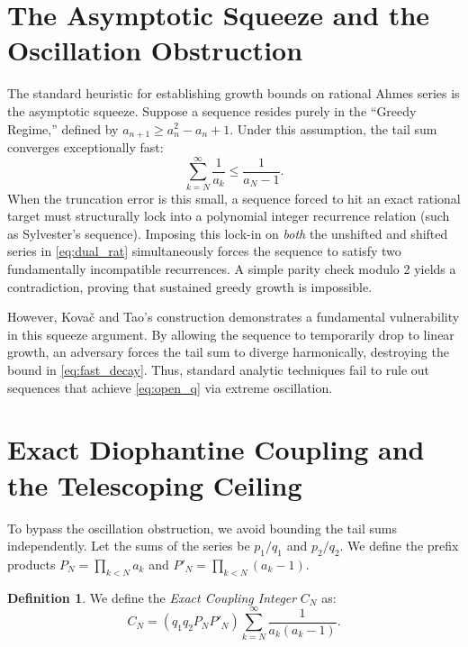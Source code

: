 \documentclass[11pt,reqno]{amsart}
\theoremstyle{definition}
\newtheorem{definition}[theorem]{Definition}
\begin{document}
\section{The Asymptotic Squeeze and the Oscillation Obstruction}

The standard heuristic for establishing growth bounds on rational Ahmes series is the asymptotic squeeze. Suppose a sequence resides purely in the ``Greedy Regime,'' defined by $a_{n+1} \ge a_n^2 - a_n + 1$. Under this assumption, the tail sum converges exceptionally fast:
\begin{equation}\label{eq:fast_decay}
\sum_{k=N}^\infty \frac{1}{a_k} \le \frac{1}{a_N - 1}.
\end{equation}
When the truncation error is this small, a sequence forced to hit an exact rational target must structurally lock into a polynomial integer recurrence relation (such as Sylvester's sequence). Imposing this lock-in on \emph{both} the unshifted and shifted series in \eqref{eq:dual_rat} simultaneously forces the sequence to satisfy two fundamentally incompatible recurrences. A simple parity check modulo 2 yields a contradiction, proving that sustained greedy growth is impossible.

However, Kova\v{c} and Tao's construction demonstrates a fundamental vulnerability in this squeeze argument. By allowing the sequence to temporarily drop to linear growth, an adversary forces the tail sum to diverge harmonically, destroying the bound in \eqref{eq:fast_decay}. Thus, standard analytic techniques fail to rule out sequences that achieve \eqref{eq:open_q} via extreme oscillation.

\section{Exact Diophantine Coupling and the Telescoping Ceiling}

To bypass the oscillation obstruction, we avoid bounding the tail sums independently. Let the sums of the series be $p_1/q_1$ and $p_2/q_2$. We define the prefix products $P_N = \prod_{k < N} a_k$ and $P'_N = \prod_{k < N} (a_k - 1)$. 

\begin{definition}
We define the \emph{Exact Coupling Integer} $C_N$ as:
\begin{equation}
C_N = \left( q_1 q_2 P_N P'_N \right) \sum_{k=N}^\infty \frac{1}{a_k(a_k - 1)}.
\end{equation}
\end{definition}
\end{document}
